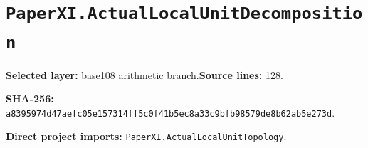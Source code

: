 \documentclass[10pt,oneside]{book}
\begin{document}
\section{\texorpdfstring{\nolinkurl{PaperXI.ActualLocalUnitDecomposition}}{PaperXI.ActualLocalUnitDecomposition}}\label{module:PaperXI.ActualLocalUnitDecomposition}

\textbf{Selected layer:} base108 arithmetic branch.\quad\textbf{Source lines:} 128.\par\textbf{SHA-256:} {\scriptsize\nolinkurl{a8395974d47aefc05e157314ff5c0f41b5ec8a33c9bfb98579de8b62ab5e273d}}.


\textbf{Direct project imports:} \nolinkurl{PaperXI.ActualLocalUnitTopology}.
\end{document}
